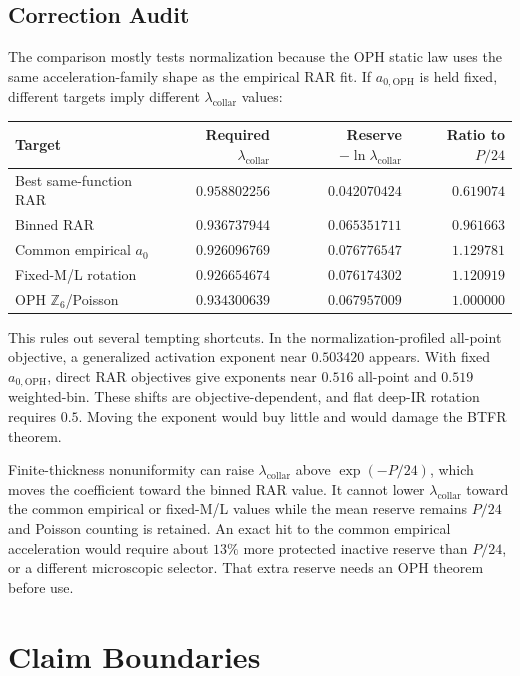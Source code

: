 \documentclass[11pt]{article}
\newcommand{\aoph}{a_{0,\mathrm{OPH}}}
\newcommand{\lambdac}{\lambda_{\mathrm{collar}}}
\newcommand{\Zsix}{\mathbb Z_6}
\begin{document}
\subsection{Correction Audit}

The comparison mostly tests normalization because the OPH static law uses the
same acceleration-family shape as the empirical RAR fit.  If \(\aoph\) is held
fixed, different targets imply different \(\lambdac\) values:

\begin{center}
\begin{tabular}{@{}lrrr@{}}
\toprule
Target & Required \(\lambdac\) & Reserve \(-\ln\lambdac\) & Ratio to \(P/24\) \\
\midrule
Best same-function RAR & \(0.958802256\) & \(0.042070424\) & \(0.619074\) \\
Binned RAR & \(0.936737944\) & \(0.065351711\) & \(0.961663\) \\
Common empirical \(a_0\) & \(0.926096769\) & \(0.076776547\) & \(1.129781\) \\
Fixed-M/L rotation & \(0.926654674\) & \(0.076174302\) & \(1.120919\) \\
OPH \(\Zsix\)/Poisson & \(0.934300639\) & \(0.067957009\) & \(1.000000\) \\
\bottomrule
\end{tabular}
\end{center}

This rules out several tempting shortcuts.  In the normalization-profiled
all-point objective, a generalized activation exponent near \(0.503420\)
appears.  With fixed \(\aoph\), direct RAR objectives give exponents near
\(0.516\) all-point and \(0.519\) weighted-bin.  These shifts are
objective-dependent, and flat deep-IR rotation requires \(0.5\).  Moving the
exponent would buy little and would damage the BTFR theorem.

Finite-thickness nonuniformity can raise \(\lambdac\) above \(\exp(-P/24)\),
which moves the coefficient toward the binned RAR value.  It cannot lower
\(\lambdac\) toward the common empirical or fixed-M/L values while the mean
reserve remains \(P/24\) and Poisson counting is retained.  An exact hit to
the common empirical acceleration would require about \(13\%\) more protected
inactive reserve than \(P/24\), or a different microscopic selector.  That
extra reserve needs an OPH theorem before use.

\section{Claim Boundaries}
\end{document}
